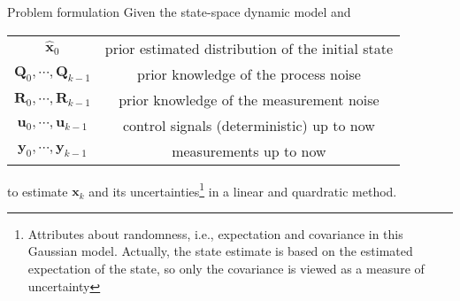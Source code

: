 \documentclass[utf-8, 10pt, aspectratio=169]{beamer}
\begin{document}
\begin{frame}{Problem formulation}
	Given the state-space dynamic model and
	\begin{table}
		\begin{tabular}{cc}
			\toprule
			\(\hat{\mathbf{x}}_0\)                     & prior estimated distribution of the initial state \\
			\(\mathbf{Q}_0, \cdots, \mathbf{Q}_{k-1}\) & prior knowledge of the process noise              \\
			\(\mathbf{R}_0, \cdots, \mathbf{R}_{k-1}\) & prior knowledge of the measurement noise          \\
			\(\mathbf{u}_0, \cdots, \mathbf{u}_{k-1}\) & control signals (deterministic) up to now         \\
			\(\mathbf{y}_0, \cdots, \mathbf{y}_{k-1}\) & measurements up to now                            \\
			\bottomrule
		\end{tabular}
	\end{table}
	to estimate \(\mathbf{x}_{k}\) and its uncertainties\footnote{Attributes about randomness, i.e., expectation and covariance in this Gaussian model. Actually, the state estimate is based on the estimated expectation of the state, so only the covariance is viewed as a measure of uncertainty} in a linear and quardratic method.
\end{frame}
\end{document}
